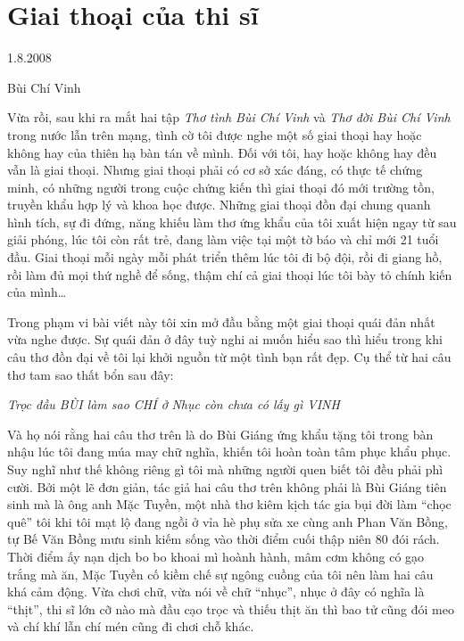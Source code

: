 \documentclass[../main.tex]{subfiles}
\begin{document}
\chapter{Giai thoại của thi sĩ}

\begin{metadata}

\begin{flushright}1.8.2008\end{flushright}

Bùi Chí Vinh



\end{metadata}

\begin{multicols}{2}

Vừa rồi, sau khi ra mắt hai tập \textit{Thơ tình Bùi Chí Vinh} và \textit{Thơ đời Bùi Chí Vinh} trong nước lẫn trên mạng, tình cờ tôi được nghe một số giai thoại hay hoặc không hay của thiên hạ bàn tán về mình. Ðối với tôi, hay hoặc không hay đều vẫn là giai thoại. Nhưng giai thoại phải có cơ sở xác đáng, có thực tế chứng minh, có những người trong cuộc chứng kiến thì giai thoại đó mới trường tồn, truyền khẩu hợp lý và khoa học được. Những giai thoại đồn đại chung quanh hình tích, sự đi đứng, năng khiếu làm thơ ứng khẩu của tôi xuất hiện ngay từ sau giải phóng, lúc tôi còn rất trẻ, đang làm việc tại một tờ báo và chỉ mới 21 tuổi đầu. Giai thoại mỗi ngày mỗi phát triển thêm lúc tôi đi bộ đội, rồi đi giang hồ, rồi làm đủ mọi thứ nghề để sống, thậm chí cả giai thoại lúc tôi bày tỏ chính kiến của mình… 
 
Trong phạm vi bài viết này tôi xin mở đầu bằng một giai thoại quái đản nhất vừa nghe được. Sự quái đản ở đây tuỳ nghi ai muốn hiểu sao thì hiểu trong khi câu thơ đồn đại về tôi lại khởi nguồn từ một tình bạn rất đẹp. Cụ thể từ hai câu thơ tam sao thất bổn sau đây: 
\begin{blockquote}
        
\textit{Trọc đầu BÙI làm sao CHÍ ở} 
\textit{Nhục còn chưa có lấy gì VINH} 

\end{blockquote}
 
Và họ nói rằng hai câu thơ trên là do Bùi Giáng ứng khẩu tặng tôi trong bàn nhậu lúc tôi đang múa may chữ nghĩa, khiến tôi hoàn toàn tâm phục khẩu phục. Suy nghĩ như thế không riêng gì tôi mà những người quen biết tôi đều phải phì cười. Bởi một lẽ đơn giản, tác giả hai câu thơ trên không phải là Bùi Giáng tiên sinh mà là ông anh Mặc Tuyền, một nhà thơ kiêm kịch tác gia bụi đời làm “chọc quê” tôi khi tôi mạt lộ đang ngồi ở vỉa hè phụ sửa xe cùng anh Phan Văn Bồng, tự Bế Văn Bồng mưu sinh kiếm sống vào thời điểm cuối thập niên 80 đói rách. Thời điểm ấy nạn dịch bo bo khoai mì hoành hành, mâm cơm không có gạo trắng mà ăn, Mặc Tuyền cố kiềm chế sự ngông cuồng của tôi nên làm hai câu khá cảm động. Vừa chơi chữ, vừa nói về chữ “nhục”, nhục ở đây có nghĩa là “thịt”, thi sĩ lớn cỡ nào mà đầu cạo trọc và thiếu thịt ăn thì bao tử cũng đói meo và chí khí lẫn chí mén cũng đi chơi chỗ khác. 
 

\end{multicols}
\end{document}
